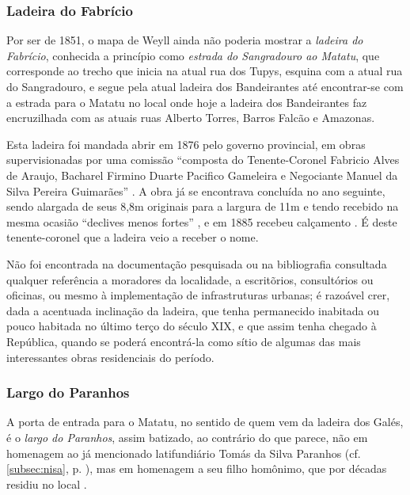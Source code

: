 \subsubsection{Ladeira do Fabrício}\label{subsubsec:fabricio}

Por ser de 1851, o mapa de Weyll ainda não poderia mostrar a \textit{ladeira do Fabrício}, conhecida a princípio como \textit{estrada do Sangradouro ao Matatu}, que corresponde ao trecho que inicia na atual rua dos Tupys, esquina com a atual rua do Sangradouro, e segue pela atual ladeira dos Bandeirantes até encontrar-se com a estrada para o Matatu no local onde hoje a ladeira dos Bandeirantes faz encruzilhada com as atuais ruas Alberto Torres, Barros Falcão e Amazonas. 

Esta ladeira foi mandada abrir em 1876 pelo governo provincial, em obras supervisionadas por uma comissão ``composta do Tenente-Coronel Fabricio Alves de Araujo, Bacharel Firmino Duarte Pacifico Gameleira e Negociante Manuel da Silva Pereira Guimarães'' \cite[p.~23]{bahia_1878}. A obra já se encontrava concluída no ano seguinte, sendo alargada de seus 8,8m originais para a largura de 11m e tendo recebido na mesma ocasião ``declives menos fortes'' \cite[p.~228]{bahia_1879}, e em 1885 recebeu calçamento \cite[p.~11]{bahia_1885}. É deste tenente-coronel que a ladeira veio a receber o nome.

Não foi encontrada na documentação pesquisada ou na bibliografia consultada qualquer referência a moradores da localidade, a escritõrios, consultórios ou oficinas, ou mesmo à implementação de infrastruturas urbanas; é razoável crer, dada a acentuada inclinação da ladeira, que tenha permanecido inabitada ou pouco habitada no último terço do século XIX, e que assim tenha chegado à República, quando se poderá encontrá-la como sítio de algumas das mais interessantes obras residenciais do período.

\subsubsection{Largo do Paranhos}\label{subsubsec:paranhos}

A porta de entrada para o Matatu, no sentido de quem vem da ladeira dos Galés, é o \textit{largo do Paranhos}, assim batizado, ao contrário do que parece, não em homenagem ao já mencionado latifundiário Tomás da Silva Paranhos (cf. \autoref{subsec:nisa}, p. \pageref{subsec:nisa}), mas em homenagem a seu filho homônimo, que por décadas residiu no local \cite{dorea_ruas_1999}.

